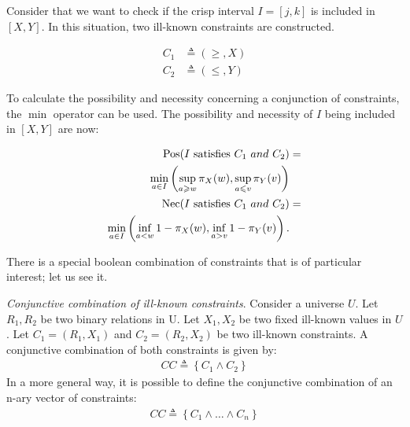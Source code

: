 \begin{example}
Consider that we want to check if the crisp interval $I = \left[j, k\right]$ is included in $\left[X, Y\right]$. In this situation, two ill-known constraints are constructed.


\vspace{-10pt}

\begin{eqnarray}
\label{eq:constraint-c1}
C_1 & \triangleq\left(\geq,X\right)\\
\label{eq:constraint-c2}
C_2 & \triangleq\left(\leq,Y\right)
\end{eqnarray}

To calculate the possibility and necessity concerning a conjunction of constraints, the $\min$ operator can be used. The possibility and necessity of $I$ being included in $\left[X, Y\right]$ are now: %

\vspace{-10pt}

\begin{align}
\label{eq:interval-pos}
\operatorname{Pos}(I\text{ satisfies }C_1\ and\ C_2) & =\\
\nonumber
\min_{a \in I}\left(\sup_{a \geqslant w}\pi_{X}(w),\sup_{a \leqslant v}\pi_{Y}(v)\right)\\
\label{eq:interval-nec}
\operatorname{Nec}(I\text{ satisfies }C_1\ and\ C_2) & =\\
\nonumber
\min_{a \in I}\left(\inf_{a < w} 1-\pi_{X}(w),\inf_{a > v} 1-\pi_{Y}(v)\right).
\end{align}
\end{example}

There is a special boolean combination of constraints that is of particular interest; let us see it.
\begin{definition}
\emph{Conjunctive combination of ill-known constraints}. Consider a universe $U$. Let $R_1, R_2$ be two binary relations in U. Let $X_1, X_2$ be two fixed ill-known values in $U$. Let  $C_1 = (R_1, X_1)$ and $C_2 = (R_2, X_2)$ be two ill-known constraints. A conjunctive combination of both constraints is given by:
\begin{align}
\label{eq:convex-combination}
CC \triangleq \left \lbrace C_1 \wedge C_2 \right \rbrace
\end{align}
In a more general way, it is possible to define the conjunctive combination of an n-ary vector of constraints:
\begin{align}
\label{eq:nary-convex-combination}
CC \triangleq \left \lbrace C_1 \wedge \ldots \wedge C_n \right \rbrace
\end{align}
\end{definition}

